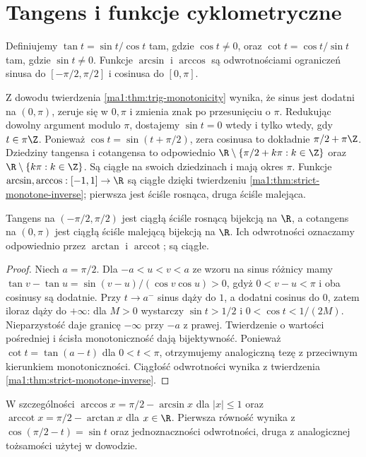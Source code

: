 \section{Tangens i funkcje cyklometryczne}
\begin{definicja}
\label{ma1:def:inverse-trig}
Definiujemy $\tan t=\sin t/\cos t$ tam, gdzie $\cos t\ne0$, oraz $\cot t=\cos t/\sin t$ tam, gdzie $\sin t\ne0$. Funkcje $\arcsin$ i $\arccos$ są odwrotnościami ograniczeń sinusa do $[-\pi/2,\pi/2]$ i cosinusa do $[0,\pi]$.
\end{definicja}
Z dowodu twierdzenia \ref{ma1:thm:trig-monotonicity} wynika, że sinus jest dodatni na $(0,\pi)$, zeruje się w $0,\pi$ i zmienia znak po przesunięciu o $\pi$. Redukując dowolny argument modulo $\pi$, dostajemy $\sin t=0$ wtedy i tylko wtedy, gdy $t\in\pi\Z$. Ponieważ $\cos t=\sin(t+\pi/2)$, zera cosinusa to dokładnie $\pi/2+\pi\Z$. Dziedziny tangensa i cotangensa to odpowiednio $\R\setminus\{\pi/2+k\pi:k\in\Z\}$ oraz $\R\setminus\{k\pi:k\in\Z\}$. Są ciągłe na swoich dziedzinach i mają okres $\pi$. Funkcje $\arcsin,\arccos:[-1,1]\to\R$ są ciągłe dzięki twierdzeniu \ref{ma1:thm:strict-monotone-inverse}; pierwsza jest ściśle rosnąca, druga ściśle malejąca.
\begin{twierdzenie}
\label{ma1:thm:tan-inverse}
Tangens na $(-\pi/2,\pi/2)$ jest ciągłą ściśle rosnącą bijekcją na $\R$, a cotangens na $(0,\pi)$ jest ciągłą ściśle malejącą bijekcją na $\R$. Ich odwrotności oznaczamy odpowiednio przez $\arctan$ i $\operatorname{arccot}$; są ciągłe.
\end{twierdzenie}
\begin{proof}
Niech $a=\pi/2$. Dla $-a<u<v<a$ ze wzoru na sinus różnicy mamy
$\tan v-\tan u=\sin(v-u)/(\cos v\cos u)>0$, gdyż $0<v-u<\pi$ i oba cosinusy są dodatnie. Przy $t\to a^-$ sinus dąży do $1$, a dodatni cosinus do $0$, zatem iloraz dąży do $+\infty$: dla $M>0$ wystarczy $\sin t>1/2$ i $0<\cos t<1/(2M)$. Nieparzystość daje granicę $-\infty$ przy $-a$ z prawej. Twierdzenie o wartości pośredniej i ścisła monotoniczność dają bijektywność. Ponieważ $\cot t=\tan(a-t)$ dla $0<t<\pi$, otrzymujemy analogiczną tezę z przeciwnym kierunkiem monotoniczności. Ciągłość odwrotności wynika z twierdzenia \ref{ma1:thm:strict-monotone-inverse}.
\end{proof}
W szczególności $\arccos x=\pi/2-\arcsin x$ dla $|x|\le1$ oraz $\operatorname{arccot}x=\pi/2-\arctan x$ dla $x\in\R$. Pierwsza równość wynika z $\cos(\pi/2-t)=\sin t$ oraz jednoznaczności odwrotności, druga z analogicznej tożsamości użytej w dowodzie.

